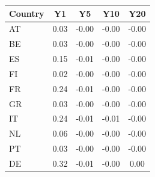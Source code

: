 \begin{tabular}{lcccc}
\toprule
Country & Y1 & Y5 & Y10 & Y20 \\
\midrule
AT & 0.03 & -0.00 & -0.00 & -0.00 \\
BE & 0.03 & -0.00 & -0.00 & -0.00 \\
ES & 0.15 & -0.01 & -0.00 & -0.00 \\
FI & 0.02 & -0.00 & -0.00 & -0.00 \\
FR & 0.24 & -0.01 & -0.00 & -0.00 \\
GR & 0.03 & -0.00 & -0.00 & -0.00 \\
IT & 0.24 & -0.01 & -0.01 & -0.00 \\
NL & 0.06 & -0.00 & -0.00 & -0.00 \\
PT & 0.03 & -0.00 & -0.00 & -0.00 \\
DE & 0.32 & -0.01 & -0.00 & 0.00 \\
\bottomrule
\end{tabular}

